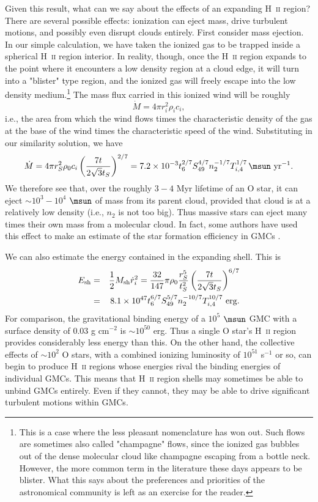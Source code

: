 Given this result, what can we say about the effects of an expanding H~\textsc{ii} region? There are several possible effects: ionization can eject mass, drive turbulent motions, and possibly even disrupt clouds entirely. First consider mass ejection. In our simple calculation, we have taken the ionized gas to be trapped inside a spherical H~\textsc{ii} region interior. In reality, though, once the H~\textsc{ii} region expands to the point where it encounters a low density region at a cloud edge, it will turn into a "blister" type region, and the ionized gas will freely escape into the low density medium.\footnote{This is a case where the less pleasant nomenclature has won out. Such flows are sometimes also called "champagne" flows, since the ionized gas bubbles out of the dense molecular cloud like champagne escaping from a bottle neck. However, the more common term in the literature these days appears to be blister. What this says about the preferences and priorities of the astronomical community is left as an exercise for the reader.} The mass flux carried in this ionized wind will be roughly
\begin{equation}
\dot{M} = 4\pi r_i^2 \rho_i c_i,
\end{equation}
i.e., the area from which the wind flows times the characteristic density of the gas at the base of the wind times the characteristic speed of the wind. Substituting in our similarity solution, we have
\begin{equation}
\dot{M} = 4\pi r_S^2 \rho_0 c_i \left(\frac{7t}{2\sqrt{3} t_S}\right)^{2/7} = 7.2\times 10^{-3} t_6^{2/7} S_{49}^{4/7} n_2^{-1/7} T_{i,4}^{1/7}\,\msun\mbox{ yr}^{-1}.
\end{equation}
We therefore see that, over the roughly $3-4$ Myr lifetime of an O star, it can eject $\sim 10^3 - 10^4$ $\msun$ of mass from its parent cloud, provided that cloud is at a relatively low density (i.e., $n_2$ is not too big). Thus massive stars can eject many times their own mass from a molecular cloud. In fact, some authors have used this effect to make an estimate of the star formation efficiency in GMCs \citep[e.g.,][]{matzner02a}.

We can also estimate the energy contained in the expanding shell. This is
\begin{eqnarray}
E_{\rm sh} & = & \frac{1}{2} M_{\rm sh} \dot{r}_i^2 = \frac{32}{147}\pi \rho_0 \frac{r_S^5}{t_S^2} \left(\frac{7t}{2\sqrt{3} t_S}\right)^{6/7}
\nonumber \\
& = & 8.1\times 10^{47} t_6^{6/7} S_{49}^{5/7} n_2^{-10/7} T_{i,4}^{10/7}\mbox{ erg}.
\end{eqnarray}
For comparison, the gravitational binding energy of a $10^5$ $\msun$ GMC with a surface density of $0.03$ g cm$^{-2}$ is $\sim 10^{50}$ erg. Thus a single O star's H~\textsc{ii} region provides considerably less energy than this. On the other hand, the collective effects of $\sim 10^2$ O stars, with a combined ionizing luminosity of $10^{51}$ s$^{-1}$ or so, can begin to produce H~\textsc{ii} regions whose energies rival the binding energies of individual GMCs. This means that H~\textsc{ii} region shells may sometimes be able to unbind GMCs entirely. Even if they cannot, they may be able to drive significant turbulent motions within GMCs.

